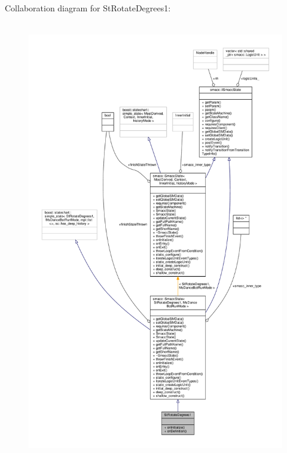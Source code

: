Collaboration diagram for St\+Rotate\+Degrees1\+:
\nopagebreak
\begin{figure}[H]
\begin{center}
\leavevmode
\includegraphics[height=550pt]{structStRotateDegrees1__coll__graph}
\end{center}
\end{figure}
